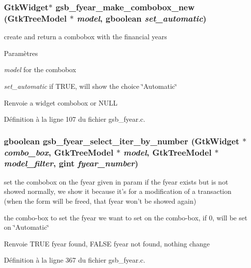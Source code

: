 \subsubsection[{gsb\_\-fyear\_\-make\_\-combobox\_\-new}]{\setlength{\rightskip}{0pt plus 5cm}GtkWidget$\ast$ gsb\_\-fyear\_\-make\_\-combobox\_\-new (GtkTreeModel $\ast$ {\em model}, \/  gboolean {\em set\_\-automatic})}\label{gsb__fyear_8c_af7e2bd1df0eccd82fa4fa78f269ae5d0}
create and return a combobox with the financial years


\begin{DoxyParams}{Paramètres}
\item[{\em model}]for the combobox \item[{\em set\_\-automatic}]if TRUE, will show the choice \char`\"{}Automatic\char`\"{}\end{DoxyParams}
\begin{DoxyReturn}{Renvoie}
a widget combobox or NULL 
\end{DoxyReturn}


Définition à la ligne 107 du fichier gsb\_\-fyear.c.

\subsubsection[{gsb\_\-fyear\_\-select\_\-iter\_\-by\_\-number}]{\setlength{\rightskip}{0pt plus 5cm}gboolean gsb\_\-fyear\_\-select\_\-iter\_\-by\_\-number (GtkWidget $\ast$ {\em combo\_\-box}, \/  GtkTreeModel $\ast$ {\em model}, \/  GtkTreeModel $\ast$ {\em model\_\-filter}, \/  gint {\em fyear\_\-number})}\label{gsb__fyear_8c_a0e0eb0128f2cec486a664a028b70a273}
set the combobox on the fyear given in param if the fyear exists but is not showed normally, we show it because it's for a modification of a transaction (when the form will be freed, that fyear won't be showed again)

the combo-\/box to set    the fyear we want to set on the combo-\/box, if 0, will be set on \char`\"{}Automatic\char`\"{}

\begin{DoxyReturn}{Renvoie}
TRUE fyear found, FALSE fyear not found, nothing change 
\end{DoxyReturn}


Définition à la ligne 367 du fichier gsb\_\-fyear.c.


